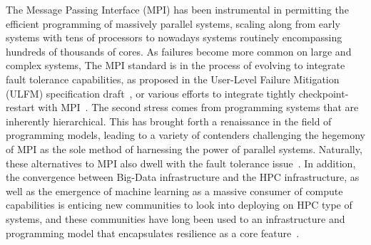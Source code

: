 \documentclass[sigconf]{acmart}
\begin{document}
The Message Passing Interface (MPI) has been instrumental in 
permitting the efficient programming of massively parallel systems, scaling 
along from early systems with tens of processors to nowadays systems routinely 
encompassing hundreds of thousands of cores. As failures become more 
common on large and complex systems, The MPI standard is in the process of 
evolving to integrate fault tolerance capabilities, as proposed in the 
User-Level Failure Mitigation (ULFM) specification draft~\cite{ulfm}, or 
various efforts to integrate tightly checkpoint-restart with MPI~\cite{reinit}.
The second stress comes from programming systems that are inherently
hierarchical. This has brought forth a renaissance in the field of
programming models, leading to a variety of contenders challenging the
hegemony of MPI as the sole method of harnessing the power of parallel systems.
Naturally, these alternatives to MPI also dwell with the fault tolerance
issue~\cite{parsec-ft, oshmem-ft, x10-ft}. In addition, the convergence
between Big-Data infrastructure and the HPC infrastructure, as well as
the emergence of machine learning as a massive consumer of compute
capabilities is enticing new communities to look into deploying on HPC
type of systems, and these communities have long been used to an infrastructure
and programming model that encapsulates resilience as a core feature~\cite{hadoop}.
\end{document}

